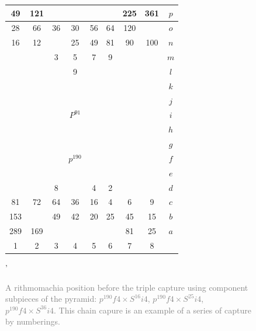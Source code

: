\documentclass[12pt]{article}
\begin{document}
\begin{figure}[h!] 
\centering 
\begin{tabular}{|c|c|c|c|c|c|c|c||c} \hline
\squadfill{\,}49 & \squadfill{\,}121 & \quad  & \quad  & \quad  & \quad  & \squadfill{\,}225 & \squadfill{\,}361 & $p$ \\ \hline
\squadfill{\,}28 & \squadfill{\,}66 & \trianglepafill{\,}36 & \trianglepafill{\,}30 & \trianglepafill{\,}56 & \trianglepafill{\,}64 & \squadfill{\,}120 & \quad  & $o$ \\ \hline
\trianglepafill{\,}16 & \trianglepafill{\,}12 & \quad  & \circletfill{\,}25 & \circletfill{\,}49 & \circletfill{\,}81 & \trianglepafill{\,}90 & \trianglepafill{\,}100 & $n$ \\ \hline
\quad  & \quad  & \circletfill{\,}3 & \circletfill{\,}5 & \circletfill{\,}7 & \circletfill{\,}9 & \quad  & \quad  & $m$ \\ \hline
\quad  & \quad  & \quad  & \circletfill{\,}9 & \quad  & \quad  & \quad  & \quad  & $l$ \\ \hline
\quad  & \quad  & \quad  & \quad  & \quad  & \quad  & \quad  & \quad  & $k$ \\ \hline
\quad  & \quad  & \quad  & \quad  & \quad  & \quad  & \quad  & \quad  & $j$ \\ \hline
\quad  & \quad  & \quad  & \rhombus{\,}$P^{91}$ & \quad  & \quad  & \quad  & \quad  & $i$ \\ \hline
\quad  & \quad  & \quad  & \quad  & \quad  & \quad  & \quad  & \quad  & $h$ \\ \hline
\quad  & \quad  & \quad  & \quad  & \quad  & \quad  & \quad  & \quad  & $g$ \\ \hline
\quad  & \quad  & \quad  & \rhombusfill{\,}$p^{190}$ & \quad  & \quad  & \quad  & \quad  & $f$ \\ \hline
\quad  & \quad  & \quad  & \quad  & \quad  & \quad  & \quad  & \quad  & $e$ \\ \hline
\quad  & \quad  & \circlet{\,}8 & \quad  & \circlet{\,}4 & \circlet{\,}2 & \quad  & \quad  & $d$ \\ \hline
\trianglepa{\,}81 & \trianglepa{\,}72 & \circlet{\,}64 & \circlet{\,}36 & \circlet{\,}16 & \circlet{\,}4 & \trianglepa{\,}6 & \trianglepa{\,}9 & $c$ \\ \hline
\squad{\,}153 & \quad  & \trianglepa{\,}49 & \trianglepa{\,}42 & \trianglepa{\,}20 & \trianglepa{\,}25 & \squad{\,}45 & \squad{\,}15 & $b$ \\ \hline
\squad{\,}289 & \squad{\,}169 & \quad  & \quad  & \quad  & \quad  & \squad{\,}81 & \squad{\,}25 & $a$ \\ \hline
1 &  2 &  3 &  4 &  5 &  6 &  7 &  8  &  \\
\end{tabular} '
\caption{\textcolor{gray}{A rithmomachia position before the triple capture using component
    subpieces of the pyramid: $p^{190}f4\times S^{16}i4$, $p^{190}f4\times S^{25}i4$, $p^{190}f4\times S^{36}i4$.
    This chain capure is an example of a series of capture by numberings.}}
\label{fig:rithmomachia-capture-C36-with-pyramid2} 
\end{figure}
\end{document}
